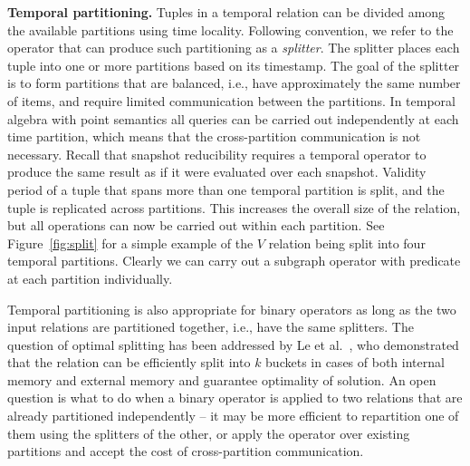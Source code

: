 {\bf Temporal partitioning.}  Tuples in a temporal relation can be
divided among the available partitions using time locality.  Following
convention, we refer to the operator that can produce such
partitioning as a {\em splitter}.  The splitter places each tuple into
one or more partitions based on its timestamp.  The goal of the
splitter is to form partitions that are balanced, i.e., have
approximately the same number of items, and require limited
communication between the partitions.  In temporal algebra with point
semantics all queries can be carried out independently at each time
partition, which means that the cross-partition communication is not
necessary.  Recall that snapshot reducibility requires a temporal
operator to produce the same result as if it were evaluated over each
snapshot.  Validity period of a tuple that spans more than one
temporal partition is split, and the tuple is replicated across
partitions.  This increases the overall size of the relation, but all
operations can now be carried out within each partition.  See
Figure~\ref{fig:split} for a simple example of the $V$ relation being
split into four temporal partitions.  Clearly we can carry out a
subgraph operator with predicate  at each
partition individually.

Temporal partitioning is also appropriate for binary operators as long
as the two input relations are partitioned together, i.e., have the
same splitters.  The question of optimal splitting has been addressed
by Le et al.~\cite{Le2013}, who demonstrated that the relation can be
efficiently split into $k$ buckets in cases of both internal memory
and external memory and guarantee optimality of solution.  An open question is what to do when a binary operator is
applied to two relations that are already partitioned independently --
it may be more efficient to repartition one of them using the
splitters of the other, or apply the operator over existing partitions
and accept the cost of cross-partition communication.


